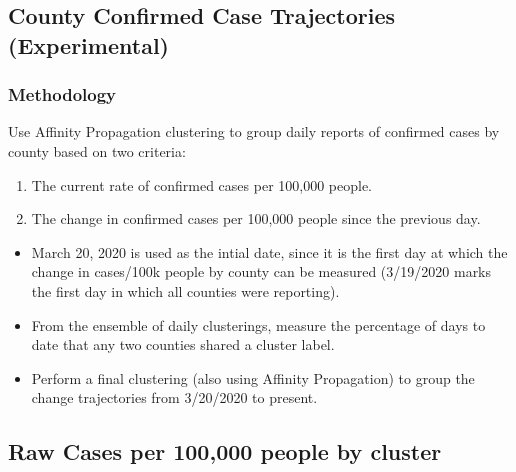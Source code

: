 \documentclass[]{article}
\providecommand{\tightlist}{%
  \setlength{\itemsep}{0pt}\setlength{\parskip}{0pt}}
\begin{document}
\newpage

\hypertarget{county-confirmed-case-trajectories-experimental}{%
\subsection{County Confirmed Case Trajectories
(Experimental)}\label{county-confirmed-case-trajectories-experimental}}

\hypertarget{methodology}{%
\subsubsection{Methodology}\label{methodology}}

Use Affinity Propagation clustering to group daily reports of confirmed
cases by county based on two criteria:

\begin{enumerate}
\def\labelenumi{\arabic{enumi}.}
\tightlist
\item
  The current rate of confirmed cases per 100,000 people.
\item
  The change in confirmed cases per 100,000 people since the previous
  day.
\end{enumerate}

\begin{itemize}
\item
  March 20, 2020 is used as the intial date, since it is the first day
  at which the change in cases/100k people by county can be measured
  (3/19/2020 marks the first day in which all counties were reporting).
\item
  From the ensemble of daily clusterings, measure the percentage of days
  to date that any two counties shared a cluster label.
\item
  Perform a final clustering (also using Affinity Propagation) to group
  the change trajectories from 3/20/2020 to present.
\end{itemize}

\hypertarget{raw-cases-per-100000-people-by-cluster}{%
\subsection{Raw Cases per 100,000 people by
cluster}\label{raw-cases-per-100000-people-by-cluster}}
\end{document}
